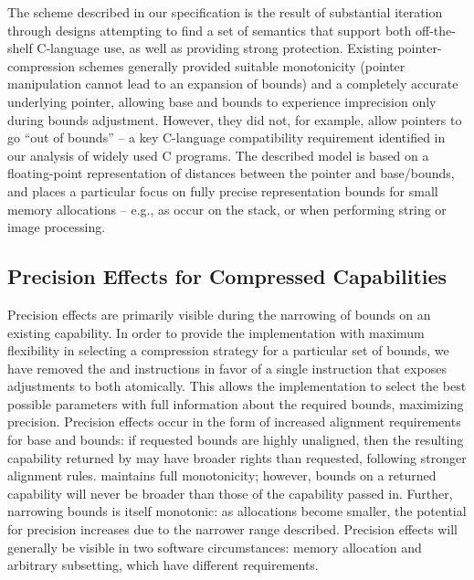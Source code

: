 The scheme described in our specification is the result of substantial
iteration through designs attempting to find a set of semantics that support
both off-the-shelf C-language use, as well as providing strong protection.
Existing pointer-compression schemes generally provided suitable monotonicity
(pointer manipulation cannot lead to an expansion of bounds) and a completely
accurate underlying pointer, allowing base and bounds to experience
imprecision only during bounds adjustment.
However, they did not, for example, allow pointers to go ``out of bounds'' --
a key C-language compatibility requirement identified in our analysis of
widely used C programs.
The described model is based on a floating-point representation of distances
between the pointer and base/bounds, and places a particular focus on fully
precise representation bounds for small memory allocations %
-- e.g., as occur on the stack, or when performing string or image processing.

\subsection{Precision Effects for Compressed Capabilities}

Precision effects are primarily visible during the narrowing of bounds on an
existing capability.
In order to provide the implementation with maximum flexibility in selecting a
compression strategy for a particular set of bounds, we have removed the
 and  instructions in favor of
a single  instruction that exposes adjustments to
both atomically.
This allows the implementation to select the best possible parameters with
full information about the required bounds, maximizing precision.
Precision effects occur in the form of increased alignment requirements for
base and bounds: if requested bounds are highly unaligned, then the resulting
capability returned by  may have broader rights than
requested, following stronger alignment rules.
 maintains full monotonicity; however, bounds on a
returned capability will never be broader than those of the capability passed in.
Further, narrowing bounds is itself monotonic: as allocations become smaller,
the potential for precision increases due to the narrower range described.
Precision effects will generally be visible in two software circumstances:
memory allocation and arbitrary subsetting, which have different
requirements.

